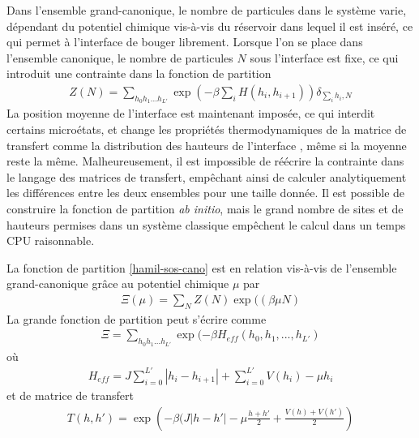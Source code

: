 Dans l'ensemble grand-canonique, le nombre de particules dans le système varie, dépendant du potentiel chimique vis-à-vis du réservoir dans lequel il est inséré, ce qui permet à l'interface de bouger librement. Lorsque l'on se place dans l'ensemble canonique, le nombre de particules $N$ sous l'interface est fixe, ce qui introduit une contrainte dans la fonction de partition
\begin{align}
	 Z(N) = \sum_{h_0 h_1 ... h_{L'}} \exp(- \beta \sum_{i} H(h_i,h_{i+1}))  \delta_{\sum_i h_i, N}
	 \label{hamil-sos-cano}
\end{align}
La position moyenne de l'interface est maintenant imposée, ce qui interdit certains microétats, et change les propriétés thermodynamiques de la matrice de transfert comme la distribution des hauteurs de l'interface \cite{siegert_scaling_1993}, même si la moyenne reste la même. Malheureusement, il est impossible de réécrire la contrainte dans le langage des matrices de transfert, empêchant ainsi de calculer analytiquement les différences entre les deux ensembles pour une taille donnée. Il est possible de construire la fonction de partition \textit{ab initio}, mais le grand nombre de sites et de hauteurs permises dans un système classique empêchent le calcul dans un temps CPU raisonnable. 

La fonction de partition \ref{hamil-sos-cano} est en relation vis-à-vis de l'ensemble grand-canonique grâce  au potentiel chimique $\mu$ par
\begin{align}
	 \Xi(\mu) = \sum_N Z(N) \exp((\beta \mu N)
\end{align}
La grande fonction de partition peut s'écrire comme
\begin{align}
    \Xi = \sum_{h_0 h_1 ... h_{L'}}  \exp(-\beta H_{eff}(h_0,h_1,...,h_{L'})
\end{align}
où 
\begin{align}
    H_{eff} = J \sum_{i=0}^{L'} |h_i-h_{i+1}|+ \sum_{i=0}^{L'} V(h_i)-\mu h_i
\end{align}
et de matrice de transfert
\begin{align}
    T(h,h') = \exp\left(-\beta (J |h-h'| - \mu \frac{h+h'}{2} + \frac{V(h)+V(h')}{2} \right)
    \label{tm-sos-grand-cano}
\end{align}

